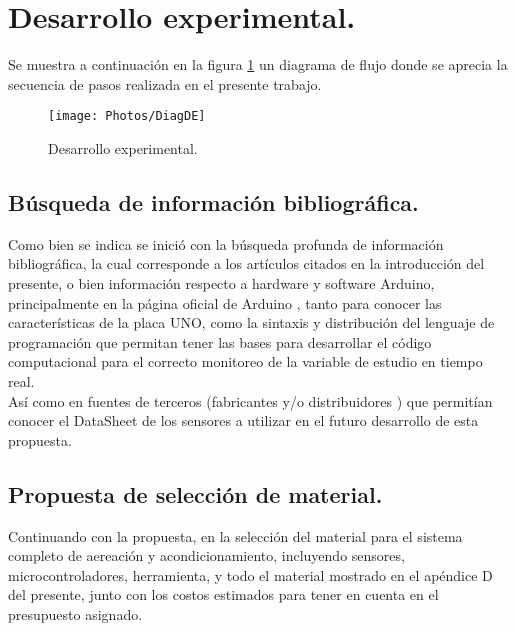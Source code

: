 \documentclass[11pt,letter
								]
								{article}
\begin{document}
\section{Desarrollo experimental.}

Se muestra a continuación en la figura \ref{DiagDE} un diagrama de flujo donde se aprecia  la secuencia de pasos  realizada en el presente trabajo.




\begin{figure}[H]
\centering
\texttt{[image: Photos/DiagDE]}
\caption{Desarrollo experimental.}
\label{DiagDE}
\end{figure}







\subsection{Búsqueda de información bibliográfica.}

Como bien se indica se inició con la búsqueda profunda de información bibliográfica, la cual corresponde a los artículos citados en la introducción del presente, o bien información respecto a hardware y software Arduino,   principalmente en la página oficial de Arduino \cite{ArduinoWeb}, tanto para conocer las características de la placa UNO, como la sintaxis y distribución del lenguaje de programación que permitan tener las bases para desarrollar el código computacional para  el correcto monitoreo de la variable de estudio en tiempo real.\\

Así como en fuentes de terceros (fabricantes y/o distribuidores ) que permitían conocer el DataSheet de los sensores a utilizar en el futuro desarrollo de esta propuesta.  \\



\subsection{Propuesta de selección  de material.}

Continuando con la  propuesta, en la selección  del material para el sistema completo de aereación y acondicionamiento, incluyendo sensores, microcontroladores, herramienta, y todo el material mostrado en el apéndice D del presente, junto con los costos estimados para tener en cuenta en el presupuesto asignado. 
\end{document}
